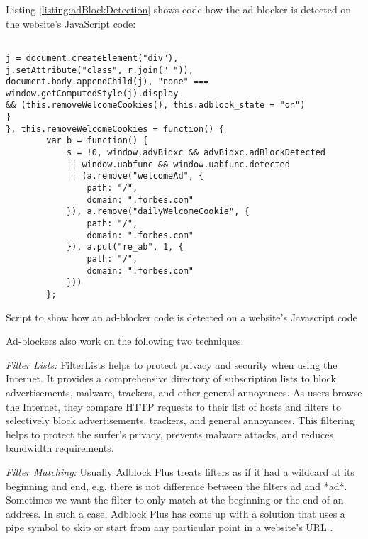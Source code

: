 \documentclass[runningheads,a4paper]{llncs}
\begin{document}
Listing \ref{listing:adBlockDetection} shows code how the ad-blocker is detected on the website's JavaScript code:
\begin{listing}[!ht]
\begin{verbatim}
               
j = document.createElement("div"),
j.setAttribute("class", r.join(" ")), 
document.body.appendChild(j), "none" === window.getComputedStyle(j).display 
&& (this.removeWelcomeCookies(), this.adblock_state = "on")
}
}, this.removeWelcomeCookies = function() {
        var b = function() {
            s = !0, window.advBidxc && advBidxc.adBlockDetected 
            || window.uabfunc && window.uabfunc.detected 
            || (a.remove("welcomeAd", {
                path: "/",
                domain: ".forbes.com"
            }), a.remove("dailyWelcomeCookie", {
                path: "/",
                domain: ".forbes.com"
            }), a.put("re_ab", 1, {
                path: "/",
                domain: ".forbes.com"
            }))
        };
\end{verbatim}
\caption{Script to show how an ad-blocker code is detected on a website's Javascript code}
\label{listing:adBlockDetection}
\end{listing}
Ad-blockers also work on the following two techniques:

\textit{Filter Lists:} FilterLists \cite{filterLists} helps to protect privacy and security when using the Internet. It provides a comprehensive directory of subscription lists to block advertisements, malware, trackers, and other general annoyances. As users browse the Internet, they compare HTTP requests to their list of hosts and filters to selectively block advertisements, trackers, and general annoyances. This filtering helps to protect the surfer’s privacy, prevents malware attacks, and reduces bandwidth requirements.

\textit{Filter Matching:} Usually Adblock Plus treats filters as if it had a wildcard at its beginning and end, e.g. there is not difference between the filters ad and *ad*. Sometimes we want the filter to only match at the beginning or the end of an address. In such a case, Adblock Plus has come up with a solution that uses a pipe symbol to skip or start from any particular point in a website's URL \cite{filterMatching}.
\end{document}
